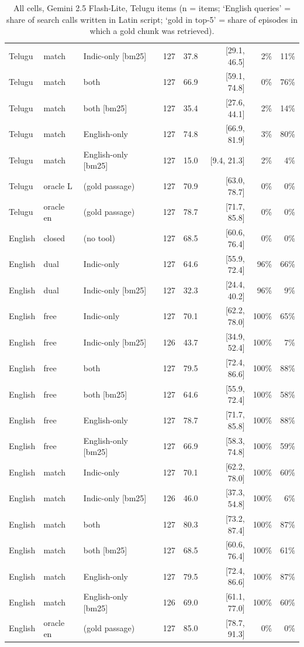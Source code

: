 \begin{table}[h]
\begin{tabular}{lllrrrrr}
Telugu & match & Indic-only [bm25] & 127 & 37.8 & [29.1, 46.5] & 2\% & 11\% \\
Telugu & match & both & 127 & 66.9 & [59.1, 74.8] & 0\% & 76\% \\
Telugu & match & both [bm25] & 127 & 35.4 & [27.6, 44.1] & 2\% & 14\% \\
Telugu & match & English-only & 127 & 74.8 & [66.9, 81.9] & 3\% & 80\% \\
Telugu & match & English-only [bm25] & 127 & 15.0 & [9.4, 21.3] & 2\% & 4\% \\
Telugu & oracle L & (gold passage) & 127 & 70.9 & [63.0, 78.7] & 0\% & 0\% \\
Telugu & oracle en & (gold passage) & 127 & 78.7 & [71.7, 85.8] & 0\% & 0\% \\
English & closed & (no tool) & 127 & 68.5 & [60.6, 76.4] & 0\% & 0\% \\
English & dual & Indic-only & 127 & 64.6 & [55.9, 72.4] & 96\% & 66\% \\
English & dual & Indic-only [bm25] & 127 & 32.3 & [24.4, 40.2] & 96\% & 9\% \\
English & free & Indic-only & 127 & 70.1 & [62.2, 78.0] & 100\% & 65\% \\
English & free & Indic-only [bm25] & 126 & 43.7 & [34.9, 52.4] & 100\% & 7\% \\
English & free & both & 127 & 79.5 & [72.4, 86.6] & 100\% & 88\% \\
English & free & both [bm25] & 127 & 64.6 & [55.9, 72.4] & 100\% & 58\% \\
English & free & English-only & 127 & 78.7 & [71.7, 85.8] & 100\% & 88\% \\
English & free & English-only [bm25] & 127 & 66.9 & [58.3, 74.8] & 100\% & 59\% \\
English & match & Indic-only & 127 & 70.1 & [62.2, 78.0] & 100\% & 60\% \\
English & match & Indic-only [bm25] & 126 & 46.0 & [37.3, 54.8] & 100\% & 6\% \\
English & match & both & 127 & 80.3 & [73.2, 87.4] & 100\% & 87\% \\
English & match & both [bm25] & 127 & 68.5 & [60.6, 76.4] & 100\% & 61\% \\
English & match & English-only & 127 & 79.5 & [72.4, 86.6] & 100\% & 87\% \\
English & match & English-only [bm25] & 126 & 69.0 & [61.1, 77.0] & 100\% & 60\% \\
English & oracle en & (gold passage) & 127 & 85.0 & [78.7, 91.3] & 0\% & 0\% \\
\bottomrule
\end{tabular}
\caption{All cells, Gemini 2.5 Flash-Lite, Telugu items (n = items; `English queries' = share of search calls written in Latin script; `gold in top-5' = share of episodes in which a gold chunk was retrieved).}
\end{table}

